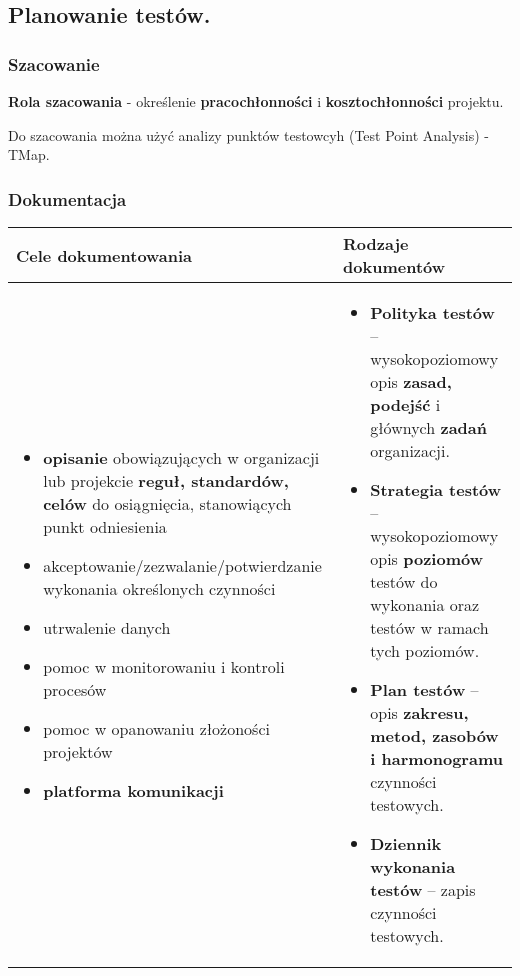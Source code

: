 \documentclass[../main.tex]{subfiles}
\begin{document}
    \subsection{Planowanie testów.}

    \subsubsection{Szacowanie}
    \textbf{Rola szacowania} - określenie \textbf{pracochłonności} i \textbf{kosztochłonności} projektu.

    Do szacowania można użyć analizy punktów testowcyh (Test Point Analysis) - TMap.

    \subsubsection{Dokumentacja}

    \begin{table}[H]
        \begin{center}
            \begin{tabular}{p{8cm} | p{8cm}}
                \textbf{Cele dokumentowania} & \textbf{Rodzaje dokumentów} \\
                \hline
                \begin{itemize}
                    \item \textbf{opisanie} obowiązujących w organizacji lub projekcie \textbf{reguł, standardów, celów} do osiągnięcia, stanowiących punkt odniesienia
                    \item akceptowanie/zezwalanie/potwierdzanie wykonania określonych czynności
                    \item utrwalenie danych
                    \item pomoc w monitorowaniu i kontroli procesów
                    \item pomoc w opanowaniu złożoności projektów
                    \item \textbf{platforma komunikacji}
                \end{itemize}
                &
                \begin{itemize}
                    \item \textbf{Polityka testów} – wysokopoziomowy opis \textbf{zasad, podejść} i głównych \textbf{zadań} organizacji.
                    \item \textbf{Strategia testów} – wysokopoziomowy opis \textbf{poziomów} testów do wykonania oraz testów w ramach tych poziomów.
                    \item \textbf{Plan testów} – opis \textbf{zakresu, metod, zasobów i harmonogramu} czynności testowych.
                    \item \textbf{Dziennik wykonania testów} – zapis czynności testowych.
                \end{itemize} \\
                \hline
            \end{tabular}
        \end{center}
    \end{table}
\end{document}
